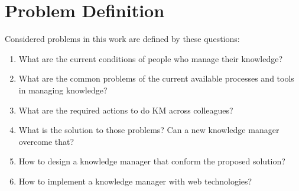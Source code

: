 \section{Problem Definition}
\label{sec:problem-definition}

Considered problems in this work are defined by these questions:

\begin{enumerate}
\item What are the current conditions of people who manage their knowledge?
\item What are the common problems of the current available processes and tools in managing knowledge?
\item What are the required actions to do KM across colleagues?
\item What is the solution to those problems? Can a new knowledge manager overcome that?
\item How to design a knowledge manager that conform the proposed solution?
\item How to implement a knowledge manager with web technologies?
\end{enumerate}
